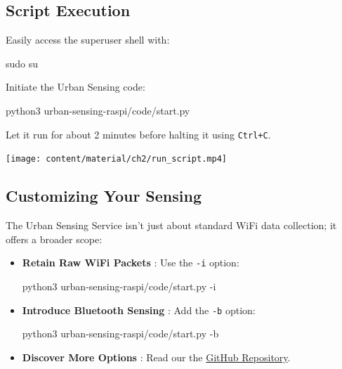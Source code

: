 \documentclass[
  letterpaper,
]{scrbook}
\newenvironment{Shaded}{\begin{snugshade}}{\end{snugshade}}
\newcommand{\AttributeTok}[1]{\textcolor[rgb]{0.40,0.45,0.13}{#1}}
\newcommand{\ExtensionTok}[1]{\textcolor[rgb]{0.00,0.23,0.31}{#1}}
\newcommand{\FunctionTok}[1]{\textcolor[rgb]{0.28,0.35,0.67}{#1}}
\newcommand{\NormalTok}[1]{\textcolor[rgb]{0.00,0.23,0.31}{#1}}
\begin{document}
\hypertarget{script-execution}{%
\subsection{Script Execution}\label{script-execution}}

Easily access the superuser shell with:

\begin{Shaded}
\begin{Highlighting}[]
\FunctionTok{sudo}\NormalTok{ su}
\end{Highlighting}
\end{Shaded}

Initiate the Urban Sensing code:

\begin{Shaded}
\begin{Highlighting}[]
\ExtensionTok{python3}\NormalTok{ urban{-}sensing{-}raspi/code/start.py}
\end{Highlighting}
\end{Shaded}

Let it run for about 2 minutes before halting it using \texttt{Ctrl+C}.

\texttt{[image: content/material/ch2/run\_script.mp4]}

\hypertarget{customizing-your-sensing}{%
\subsection{Customizing Your Sensing}\label{customizing-your-sensing}}

The Urban Sensing Service isn't just about standard WiFi data
collection; it offers a broader scope:

\begin{itemize}
\item
  \textbf{Retain Raw WiFi Packets} : Use the \texttt{-i} option:

\begin{Shaded}
\begin{Highlighting}[]
\ExtensionTok{python3}\NormalTok{ urban{-}sensing{-}raspi/code/start.py }\AttributeTok{{-}i}
\end{Highlighting}
\end{Shaded}
\item
  \textbf{Introduce Bluetooth Sensing} : Add the \texttt{-b} option:

\begin{Shaded}
\begin{Highlighting}[]
\ExtensionTok{python3}\NormalTok{ urban{-}sensing{-}raspi/code/start.py }\AttributeTok{{-}b}
\end{Highlighting}
\end{Shaded}
\item
  \textbf{Discover More Options} : Read our the
  \href{https://github.com/urbanjuhyeon/urban-sensing-raspi}{GitHub
  Repository}.
\end{itemize}
\end{document}
